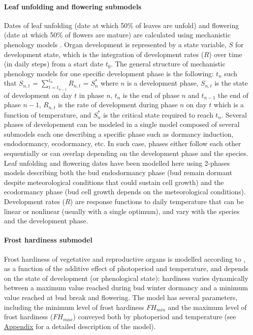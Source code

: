 \paragraph{Leaf unfolding and flowering submodels}
Dates of leaf unfolding (date at which 50\% of leaves are unfold) and flowering (date at which 50\% of flowers are mature) are calculated using mechanistic phenology models \citep{Chuine2017}. Organ development is represented by a state variable, $S$ for development state, which is the integration of development rates ($R$) over time (in daily steps) from a start date $t_0$. The general structure of mechanistic phenology models for one specific development phase is the following:
$t_n$ such that $S_{n,t}$ = $\sum_{t=t_{n-1}}^{t_n} R_{n,t}$ = $S_n^*$ 
where $n$ is a development phase, $S_{n,t}$ is the state of development on day $t$ in phase $n$, $t_n$ is the end of phase $n$ and  $t_{n-1}$ the end of phase ${n-1}$, $R_{n,t}$ is the rate of development during phase $n$ on day $t$ which is a function of  temperature, and $S_n^*$ is the critical state required to reach $t_n$.  Several phases of developement can be modeled in a single model composed of several submodels each one describing a specific phase such as dormancy induction, endodormancy, ecodormancy, etc. In such case, phases either follow each other sequentially or can overlap depending on the development phase and the species. Leaf unfolding and flowering dates have been modelled here using 2-phases models describing both the bud endodormancy phase (bud remain dormant despite meteorological conditions that could sustain cell growth) and the ecodormancy phase (bud cell growth depends on the meteorological conditions).  Development rates ($R$) are response functions to daily temperature that can be linear or nonlinear (usually with a single optimum), and vary with the species and the development phase. 

\paragraph{Frost hardiness submodel}

Frost hardiness of vegetative and reproductive organs is modelled according to \citet{Leinonen1996}, as a function of the additive effect of photoperiod and temperature, and depends on the state of development (or phenological state): hardiness varies dynamically between a maximum value reached during bud winter dormancy and a minimum value reached at bud break and flowering. The model has several parameters, including the minimum level of frost hardiness $FH_{min}$ and the maximum level of frost hardiness ($FH_{max}$) conveyed both by photoperiod and temperature (see \hyperref[app:chapter3]{Appendix} for a detailed description of the model). 

